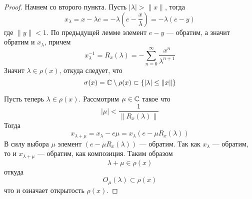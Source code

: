 \begin{proof}
	Начнем со второго пункта. Пусть $|\lambda| > \|x\|$, тогда 
	$$
	x_\lambda = x - \lambda e = -\lambda\left(e - \frac{x}{\lambda}\right) = -\lambda(e - y)
	$$
	где $\|y\| < 1$. По предыдущей лемме элемент $e - y$ --- обратим, а значит обратим и $x_\lambda$, причем
	$$
	x_\lambda^{-1} = R_x(\lambda)  = - \sum_{n=0}^\infty \frac{x^n}{\lambda^{n+1}}
	$$
	Значит $\lambda \in \rho(x)$, откуда следует, что 
	$$
	\sigma(x) = \mathbb{C} \setminus \rho(x) \subset \{|\lambda| \leq \|x\|\}
	$$
	
	Пусть теперь $\lambda \in \rho(x)$. Рассмотрим $\mu \in \mathbb{C}$ такое что 
	$$
	|\mu| < \frac{1}{\|R_x(\lambda)\|}
	$$
	Тогда 
	$$
	x_{\lambda + \mu} = x_\lambda - e\mu = x_\lambda(e - \mu R_x(\lambda))
	$$
	В силу выбора $\mu$ элемент $(e - \mu R_x(\lambda))$ --- обратим. Так как $x_\lambda$ --- обратим, то и $x_{\lambda + \mu}$ --- обратим, как композиция. Таким образом
	$$
	\lambda + \mu \in \rho(x)
	$$
	откуда 
	$$
	O_\mu(\lambda) \subset \rho(x)
	$$
	что и означает открытость $\rho(x)$.
	

\end{proof}
